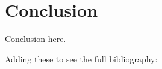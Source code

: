 \documentclass[12pt, letterpaper, titlepage]{article}
\begin{document}
\hypertarget{sec:conclusion}{%
\section{Conclusion}\label{sec:conclusion}}

Conclusion here.

Adding these to see the full bibliography: 

\citet{Steinskog}
\citet{Weiss}
\citet{Massey}
\citet{Lilliefors}
\citet{Arnold}
\citet{Conover}
\citet{Gleser}
\citet{Babu}
\citet{Butorina}
\citet{Racine}
\citet{Wang}
\citet{Capasso}
\citet{Dimitrova}



\end{document}
